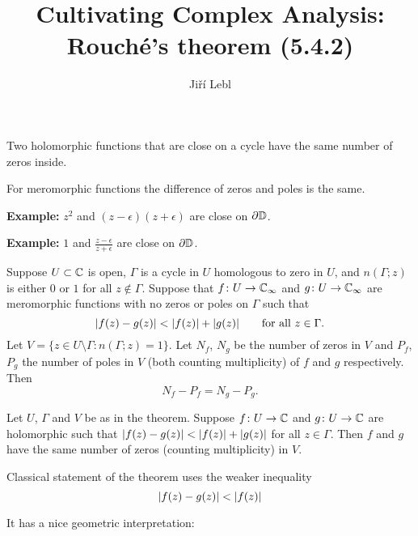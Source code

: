 \documentclass[10pt,aspectratio=169]{beamer}
\author{Ji\v{r}\'i Lebl}
\institute[OSU]{%
Departemento pri Matematiko de Oklahoma {\^S}tata Universitato}
\title{Cultivating Complex Analysis:\\%
Rouch\'e's theorem (5.4.2)}
\date{}
\begin{document}
\begin{frame}
\titlepage
\end{frame}

\begin{frame}
Two holomorphic functions that are close on a cycle
have the same number of zeros inside.

\pause
\bigskip

For meromorphic functions the difference of zeros and poles
is the same.

\pause
\bigskip

\textbf{Example:} $z^2$ and $(z-\epsilon)(z+\epsilon)$ are close on $\partial {\mathbb{D}}$.

\pause
\bigskip

\textbf{Example:} $1$ and $\frac{z-\epsilon}{z+\epsilon}$ are close on $\partial {\mathbb{D}}$.

\end{frame}

\begin{frame}
\begin{theorem}[Rouch\'e]
Suppose $U \subset {\mathbb{C}}$ is open, $\Gamma$ is
a cycle in $U$ homologous to zero in $U$,
and $n(\Gamma;z)$ is either $0$ or $1$ for all $z \notin \Gamma$.
\pause
Suppose that $f \colon U \to {\mathbb{C}}_\infty$ and $g \colon U \to {\mathbb{C}}_\infty$
are meromorphic functions with no zeros or poles on
$\Gamma$ such that
\[
\lvert {f(z)-g(z)} \rvert < \lvert {f(z)} \rvert+\lvert {g(z)} \rvert
\qquad
\text{for all } z \in \Gamma .
\]
\pause
Let $V = \{ z \in U \setminus \Gamma : n(\Gamma;z) = 1 \}$.
Let $N_f$, $N_g$ be the number of zeros in $V$
and $P_f$, $P_g$ the number of poles in $V$ (both counting multiplicity)
of $f$ and $g$ respectively.
\pause
Then
\begin{equation*}
N_f - P_f = 
N_g - P_g.
\end{equation*}
\end{theorem}

\pause

\begin{corollary}[Rouch\'e]
Let $U$, $\Gamma$ and $V$ be as in the theorem.
Suppose $f \colon U \to {\mathbb{C}}$ and $g \colon U \to {\mathbb{C}}$
are holomorphic such that
$\lvert {f(z)-g(z)} \rvert < \lvert {f(z)} \rvert+\lvert {g(z)} \rvert$
for all $z \in \Gamma$.  Then $f$ and $g$ have the same number of zeros
(counting multiplicity) in $V$.
\end{corollary}
\end{frame}

\begin{frame}
Classical statement of the theorem uses the weaker inequality
\[
\lvert {f(z)-g(z)} \rvert < \lvert {f(z)} \rvert
\]

\pause

It has a nice geometric interpretation:

\begin{center}
\end{center}

\end{frame}
\end{document}
